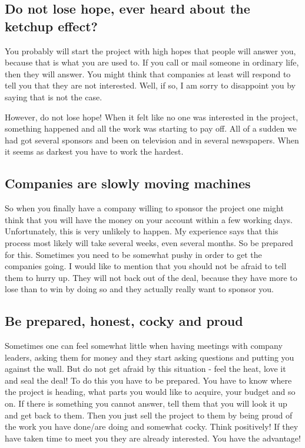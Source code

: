 \subsection{Do not lose hope, ever heard about the ketchup effect?}
You probably will start the project with high hopes that people will answer you, because that is what you are used to. If you call or mail someone in ordinary life, then they will answer. You might think that companies at least will respond to tell you that they are not interested. Well, if so, I am sorry to disappoint you by saying that is not the case.

However, do not lose hope! When it felt like no one was interested in the project, something happened and all the work was starting to pay off. All of a sudden we had got several sponsors and been on television and in several newspapers. When it seems as darkest you have to work the hardest.

\subsection{Companies are slowly moving machines}
So when you finally have a company willing to sponsor the project one might think that you will have the money on your account within a few working days. Unfortunately, this is very unlikely to happen. My experience says that this process most likely will take several weeks, even several months. So be prepared for this. Sometimes you need to be somewhat pushy in order to get the companies going. I would like to mention that you should not be afraid to tell them to hurry up. They will not back out of the deal, because they have more to lose than to win by doing so and they actually really want to sponsor you.

\subsection{Be prepared, honest, cocky and proud}
Sometimes one can feel somewhat little when having meetings with company leaders, asking them for money and they start asking questions and putting you against the wall. But do not get afraid by this situation - feel the heat, love it and seal the deal! To do this you have to be prepared. You have to know where the project is heading, what parts you would like to acquire, your budget and so on. If there is something you cannot answer, tell them that you will look it up and get back to them. Then you just sell the project to them by being proud of the work you have done/are doing and somewhat cocky.  Think positively! If they have taken time to meet you they are already interested. You have the advantage!

